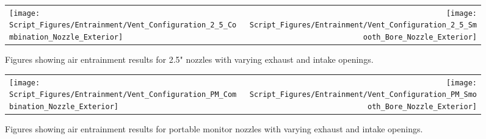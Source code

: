 \documentclass{article}
\begin{document}
\begin{figure}[!ht]
\begin{tabular*}{\textwidth}{lr}
\texttt{[image: Script\_Figures/Entrainment/Vent\_Configuration\_2\_5\_Combination\_Nozzle\_Exterior]} &
\texttt{[image: Script\_Figures/Entrainment/Vent\_Configuration\_2\_5\_Smooth\_Bore\_Nozzle\_Exterior]} \\
\end{tabular*}
\caption{Figures showing air entrainment results for 2.5" nozzles with varying exhaust and intake openings.}
\label{fig:2_5_Exterior_Vents}
\end{figure}

\begin{figure}[!ht]
\begin{tabular*}{\textwidth}{lr}
\texttt{[image: Script\_Figures/Entrainment/Vent\_Configuration\_PM\_Combination\_Nozzle\_Exterior]} &
\texttt{[image: Script\_Figures/Entrainment/Vent\_Configuration\_PM\_Smooth\_Bore\_Nozzle\_Exterior]} \\
\end{tabular*}
\caption{Figures showing air entrainment results for portable monitor nozzles with varying exhaust and intake openings.}
\label{fig:PM_Exterior_Vents}
\end{figure}

\clearpage



\end{document}
